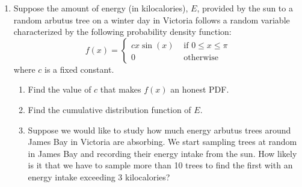 \documentclass[11pt]{article}
\begin{document}
\begin{enumerate}[label=\textbf{Q \arabic*:},start=1]

\item Suppose the amount of energy (in kilocalories), $E$, provided by the sun to a random arbutus tree on a winter day in Victoria follows a random variable characterized by the following probability density function:
\[
f(x) = \left\{
\begin{array}{ll}
cx\sin(x) & \mbox{ if } 0\leq x\leq \pi \\
0 & \mbox{ otherwise} 
\end{array}
\right.
\]
where $c$ is a fixed constant. 
\begin{enumerate}
  \item Find the value of $c$ that makes $f(x)$ an honest PDF.\\

  \item Find the cumulative distribution function of $E$.\\

  \item Suppose we would like to study how much energy arbutus trees around James Bay in Victoria are absorbing. We start sampling trees at random in James Bay and recording their energy intake from the sun. How likely is it that we have to sample more than 10 trees to find the first with an energy intake exceeding 3 kilocalories?


\end{enumerate}

\end{enumerate}
\end{document}

